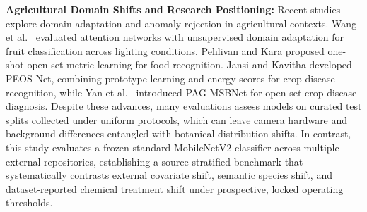 \vspace{2pt}
\noindent\textbf{Agricultural Domain Shifts and Research Positioning:} Recent studies explore domain adaptation and anomaly rejection in agricultural contexts. Wang et al.\ \cite{wang2023crossdomain} evaluated attention networks with unsupervised domain adaptation for fruit classification across lighting conditions. Pehlivan and Kara \cite{pehlivan2026lightweight} proposed one-shot open-set metric learning for food recognition. Jansi and Kavitha \cite{jansi2026peos} developed PEOS-Net, combining prototype learning and energy scores for crop disease recognition, while Yan et al.\ \cite{yan2026pagmsbnet} introduced PAG-MSBNet for open-set crop disease diagnosis. Despite these advances, many evaluations assess models on curated test splits collected under uniform protocols, which can leave camera hardware and background differences entangled with botanical distribution shifts. In contrast, this study evaluates a frozen standard MobileNetV2 classifier across multiple external repositories, establishing a source-stratified benchmark that systematically contrasts external covariate shift, semantic species shift, and dataset-reported chemical treatment shift under prospective, locked operating thresholds.
